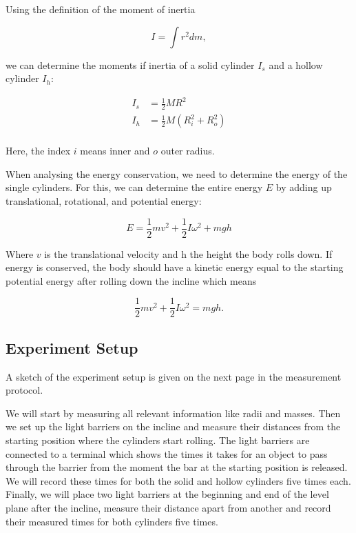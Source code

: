 \documentclass{article}
\begin{document}
Using the definition of the moment of inertia 

\begin{equation}
    I = \int r^2 dm,
    \label{eq:4}
\end{equation}

we can determine the moments if inertia of a solid cylinder $I_s$ and a hollow cylinder $I_h$:

\begin{equation}
    \begin{split}
        I_s &= \frac{1}{2} MR^2 \\
        I_h &= \frac{1}{2} M(R_i^2 + R_o^2) \\
    \end{split}
    \label{eq:5}
\end{equation}

Here, the index $i$ means inner and $o$ outer radius. 

When analysing the energy conservation, we need to determine the energy of the single cylinders. For this, we can determine the entire energy $E$ by adding up translational, rotational, and potential energy:

\begin{equation}
    E = \frac{1}{2} mv^2 + \frac{1}{2} I \omega^2 + mgh
    \label{eq:6}
\end{equation}

Where $v$ is the translational velocity and h the height the body rolls down. If energy is conserved, the body should have a kinetic energy equal to the starting potential energy after rolling down the incline which means 

\begin{equation}
    \frac{1}{2} mv^2 + \frac{1}{2} I \omega^2 = mgh.
    \label{eq:7}
\end{equation}

\subsection{Experiment Setup}

A sketch of the experiment setup is given on the next page in the measurement protocol.

We will start by measuring all relevant information like radii and masses. Then we set up the light barriers on the incline and measure their distances from the starting position where the cylinders start rolling. The light barriers are connected to a terminal which shows the times it takes for an object to pass through the barrier from the moment the bar at the starting position is released. We will record these times for both the solid and hollow cylinders five times each. Finally, we will place two light barriers at the beginning and end of the level plane after the incline, measure their distance apart from another and record their measured times for both cylinders five times.
\end{document}
